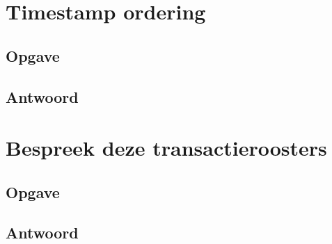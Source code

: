 \documentclass[transacties.tex]{subfiles}
\begin{document}
\section{Timestamp ordering}
\subsection*{Opgave}

\subsection*{Antwoord}

\section{Bespreek deze transactieroosters}
\subsection*{Opgave}

\subsection*{Antwoord}
\end{document}
